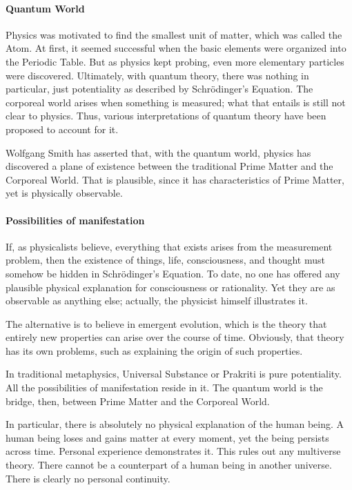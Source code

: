 \paragraph{Quantum World}
Physics was motivated to find the smallest unit of matter, which was called the Atom. At first, it seemed successful when the basic elements were organized into the Periodic Table. But as physics kept probing, even more elementary particles were discovered. Ultimately, with quantum theory, there was nothing in particular, just potentiality as described by Schrödinger's Equation. The corporeal world arises when something is measured; what that entails is still not clear to physics. Thus, various interpretations of quantum theory have been proposed to account for it.

Wolfgang Smith has asserted that, with the quantum world, physics has discovered a plane of existence between the traditional Prime Matter and the Corporeal World. That is plausible, since it has characteristics of Prime Matter, yet is physically observable.

\paragraph{Possibilities of manifestation}
If, as physicalists believe, everything that exists arises from the measurement problem, then the existence of things, life, consciousness, and thought must somehow be hidden in Schrödinger's Equation. To date, no one has offered any plausible physical explanation for consciousness or rationality. Yet they are as observable as anything else; actually, the physicist himself illustrates it.

The alternative is to believe in emergent evolution, which is the theory that entirely new properties can arise over the course of time. Obviously, that theory has its own problems, such as explaining the origin of such properties.

In traditional metaphysics, Universal Substance or Prakriti is pure potentiality. All the possibilities of manifestation reside in it. The quantum world is the bridge, then, between Prime Matter and the Corporeal World.

In particular, there is absolutely no physical explanation of the human being. A human being loses and gains matter at every moment, yet the being persists across time. Personal experience demonstrates it. This rules out any multiverse theory. There cannot be a counterpart of a human being in another universe. There is clearly no personal continuity.


